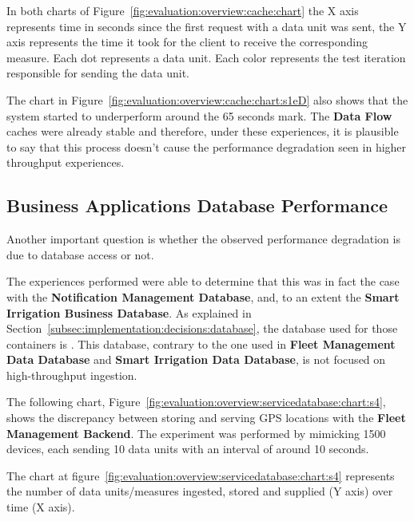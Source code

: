 In both charts of Figure~\ref{fig:evaluation:overview:cache:chart} the X axis represents time in seconds since the first request with a data unit was sent, the Y axis represents the time it took for the client to receive the corresponding measure. Each dot represents a data unit.
Each color represents the test iteration responsible for sending the data unit.
 
 The chart in Figure~\ref{fig:evaluation:overview:cache:chart:s1eD} also shows that the system started to underperform around the 65 seconds mark. The \textbf{Data Flow} caches were already stable and therefore, under these experiences, it is plausible to say that this process doesn't cause the performance degradation seen in higher throughput experiences.

\subsection{Business Applications Database Performance}
\label{subsec:evaluation:overview:servicedatabase}

Another important question is whether the observed performance degradation is due to database access or not.

The experiences performed were able to determine that this was in fact the case with the \textbf{Notification Management Database}, and, to an extent the \textbf{Smart Irrigation Business Database}. As explained in Section~\ref{subsec:implementation:decisions:database}, the database used for those containers is .
This database, contrary to the one used in \textbf{Fleet Management Data Database} and \textbf{Smart Irrigation Data Database}, is not focused on high-throughput ingestion.

The following chart, Figure~\ref{fig:evaluation:overview:servicedatabase:chart:s4}, shows the discrepancy between storing and serving GPS locations with the \textbf{Fleet Management Backend}. The experiment was performed by mimicking 1500 devices, each sending 10 data units with an interval of around 10 seconds.

The chart at figure~\ref{fig:evaluation:overview:servicedatabase:chart:s4} represents the number of data units/measures ingested, stored and supplied (Y axis) over time (X axis).

